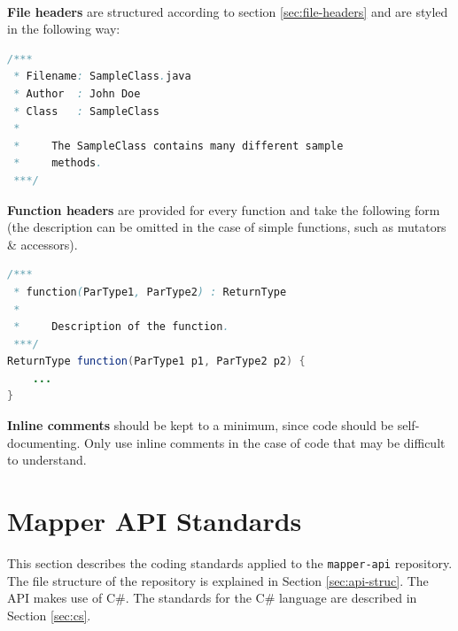 \documentclass{article}
\begin{document}
    \paragraph{}
    \textbf{File headers} are structured according to section
    \ref{sec:file-headers} and are styled in the following way:

    \begin{lstlisting}[language=Java]
/***
 * Filename: SampleClass.java
 * Author  : John Doe
 * Class   : SampleClass
 *
 *     The SampleClass contains many different sample
 *     methods.
 ***/
    \end{lstlisting}

    \textbf{Function headers} are provided for every function and take the
    following form (the description can be omitted in the case of simple
    functions, such as mutators \& accessors).

    \begin{lstlisting}[language=Java]
/***
 * function(ParType1, ParType2) : ReturnType
 *
 *     Description of the function.
 ***/
ReturnType function(ParType1 p1, ParType2 p2) {
    ...
}
    \end{lstlisting}

    \textbf{Inline comments} should be kept to a minimum, since code should be
    self-documenting. Only use inline comments in the case of code that may be
    difficult to understand.

    \newpage


    \section{Mapper API Standards}
    \label{sec:mapper-api}

    This section describes the coding standards applied to the
    \texttt{mapper-api} repository.%
    The file structure of the
    repository is explained in Section \ref{sec:api-struc}. The API makes use of
    C\#. The standards for the C\# language are described in Section
    \ref{sec:cs}.

\end{document}
